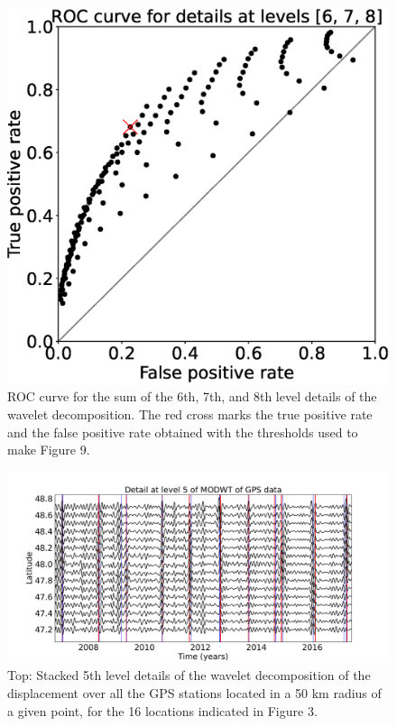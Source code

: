 \documentclass{article}
\begin{document}
\begin{figure}
\noindent\includegraphics[width=\textwidth, trim={0cm 0cm 0cm 0cm},clip]{figures/ROC_6-7-8.eps}
\caption{ROC curve for the sum of the 6th, 7th, and 8th level details of the wavelet decomposition. The red cross marks the true positive rate and the false positive rate obtained with the thresholds used to make Figure 9.}
\label{pngfiguresample}
\end{figure}

\begin{figure}
\noindent\includegraphics[width=\textwidth, trim={0cm 0cm 0cm 0cm},clip]{figures/GPS_michel_detail_5.pdf}
\caption{Top: Stacked 5th level details of the wavelet decomposition of the displacement over all the GPS stations located in a 50 km radius of a given point, for the 16 locations indicated in Figure 3.}
\label{pngfiguresample}
\end{figure}
\end{document}
